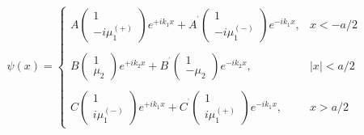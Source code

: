 \begin{equation}
\psi (x)=\left\{
\begin{array}{cc}
A\left(
\begin{array}{c}
1 \\
-i\mu _{1}^{\left( +\right) }
\end{array}
\right) e^{+ik_{1}x}+A^{^{\prime }}\left(
\begin{array}{c}
1 \\
-i\mu _{1}^{\left( -\right) }
\end{array}
\right) e^{-ik_{1}x}, & x<-a/2 \\
&  \\
B\left(
\begin{array}{c}
1 \\
\mu _{2}
\end{array}
\right) e^{+ik_{2}x}+B^{^{\prime }}\left(
\begin{array}{c}
1 \\
-\mu _{2}
\end{array}
\right) e^{-ik_{2}x}, & |x|<a/2 \\
&  \\
C\left(
\begin{array}{c}
1 \\
i\mu _{1}^{\left( -\right) }
\end{array}
\right) e^{+ik_{1}x}+C^{^{\prime }}\left(
\begin{array}{c}
1 \\
i\mu _{1}^{\left( +\right) }
\end{array}
\right) e^{-ik_{1}x}, & x>a/2
\end{array}
\right.  \label{eq50}
\end{equation}

